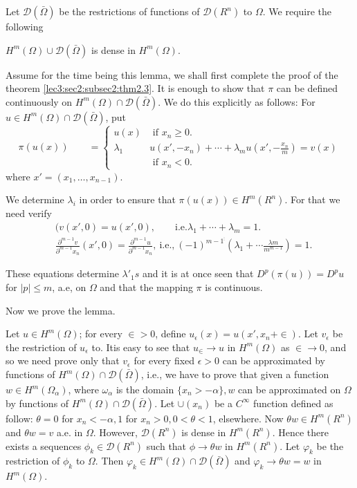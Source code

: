 Let $\mathscr{D}(\bar{\Omega})$ be the restrictions of functions of
$\mathscr{D}(R^n)$ to $\Omega$. We require the following 
\begin{lemma*}
  $H^m (\Omega)\cup \mathscr{D}(\bar{\Omega})$ is dense in $H^m (\Omega)$.
\end{lemma*}

Assume for the time being this lemma, we shall first complete the
proof of the theorem \ref{lec3:sec2:subsec2:thm2.3}. It is enough to show that $\pi$ can be
defined continuously on $H^m(\Omega)\cap \mathscr{D}
(\bar{\Omega})$. We do this explicitly as follows: For $u \in
H^m (\Omega)\cap \mathscr{D}(\bar{\Omega})$, put 
\begin{equation*}
\pi (u(x)) \qquad =
     \begin{cases}
       u (x) &\text{ if } x_n \geq 0. \\ 
       \lambda _1  &u(x', -x_n) + \cdots +
       \lambda_m u(x',- \frac{x_n}{m})=v(x)\\ 
       & \text{ if } x_n <0. 
     \end{cases}
\end{equation*}
where $x' = (x_1, \ldots,x_{n-1})$.

We determine $\lambda_i$ in order to ensure that $\pi (u(x))
\in H^m (R^n)$. For that we need verify 
\begin{align*}
  &(v(x',0)=u(x',0), \qquad \text{i.e.} \lambda_1 + \cdots + \lambda_m =1. \\
  &\frac{\partial^{ m-1}v}{\partial^{m-1}x_n}(x',0)= \frac
  {\partial^{m-1}u}{\partial^{m-1}x_n}, ~\text{i.e.,}~ (-1)^{m-1^{\vdots}}
  (\lambda_1 +\cdots \frac{\lambda m}{m^{m-1}})=1. 
\end{align*}

These equations determine $\lambda'_1s$ and it is at once seen that
$D^p (\pi (u))=D^p u$ for $|p|\le m$, a.e, on $\Omega$ and
that  the mapping $\pi$ is continuous. 

Now we prove the lemma.

Let $u \in H^m(\Omega)$; for every $\in > 0$, define
$u_\epsilon (x)=u(x',x_n+\in)$. Let $v_\epsilon$ be the
restriction of $u_\epsilon $ to. It\pageoriginale is easy to see that $u_ \in
\to u$ in $H^m (\Omega)$ as $\in \to 0$, and so we need prove
only that $v_\epsilon$ for every fixed $\epsilon >0$ can be approximated by
functions of $H^m(\Omega) \cap \mathscr{D}(\bar{\Omega})$, i.e., we
have to prove that given a function $w \in H^m(\Omega
_\alpha)$, where $\omega _ \alpha$ is the domain $\{ x_n > - \alpha
\}, w$ can be approximated on $\Omega$ by functions of
$H^m(\Omega)\cap \mathscr{D} (\bar{\Omega})$. Let $\cup (x_n)$ be a
$C^ \infty$ function defined as follow: $\theta=0$ for $x_n < - \alpha,
1$ for $x_n >0,0< \theta <1$, elsewhere. Now $\theta w \in
H^m(R^n)$ and $\theta w=v$ a.e. in $\Omega$. However,
$\mathscr{D}(R^n)$ is dense in $H^m (R^n)$. Hence there exists a
sequences $\phi _k \in \mathscr{D}(R^n)$ such that $\phi \to
\theta w$ in $H^m (R^n)$. Let $\varphi _k$ be the restriction of $\phi
_k$ to $\Omega$. Then $\varphi _k \in H^m(\Omega) \cap
\mathscr{D} (\bar{\Omega})$ and $\varphi _k \to \theta w=w$ in
$H^m(\Omega)$. 

